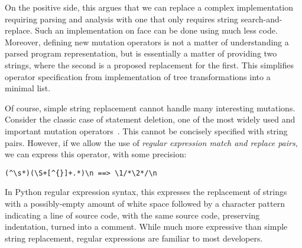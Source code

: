 \documentclass[acmsmall]{acmart}
\begin{document}
On the positive side, this argues that we can replace a
complex implementation requiring parsing and analysis with
one that only requires string search-and-replace.
Such an implementation on face can be done using much less code. 
Moreover, defining new mutation operators is not a matter of
understanding a parsed program representation, but is essentially
a matter of providing two strings, where the second is a proposed
replacement for the first.  This simplifies operator specification from
implementation of
tree transformations into a minimal list. 

Of course, simple string replacement cannot handle
many interesting mutations.  Consider the classic case of statement
deletion, one of the most widely used and important mutation
operators~\cite{deng2013empirical}. This cannot be concisely specified with string pairs. 
However, if we allow the use of
\emph{regular expression match and replace pairs}, we can express this operator, with some precision:

\begin{verbatim}
(^\s*)(\S+[^{}]+.*)\n ==> \1/*\2*/\n
\end{verbatim}

In Python regular expression syntax, this expresses the replacement of
strings with a possibly-empty amount of white space followed by a
character pattern indicating a line of source code, with the same
source code, preserving indentation, turned into a comment.
While much more expressive than simple string replacement, regular
expressions are familiar to most developers.
\end{document}
